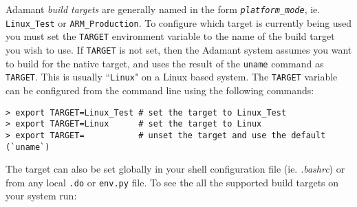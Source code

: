 Adamant \textit{build targets} are generally named in the form \texttt{\textit{platform}\_\textit{mode}}, ie. \texttt{Linux\_Test} or \texttt{ARM\_Production}. To configure which target is currently being used you must set the \texttt{TARGET} environment variable to the name of the build target you wish to use. If \texttt{TARGET} is not set, then the Adamant system assumes you want to build for the native target, and uses the result of the \texttt{uname} command as \texttt{TARGET}. This is usually ``\texttt{Linux}" on a Linux based system. The \texttt{TARGET} variable can be configured from the command line using the following commands:

\vspace{5mm} %
\begin{verbatim}
> export TARGET=Linux_Test # set the target to Linux_Test 
> export TARGET=Linux      # set the target to Linux 
> export TARGET=           # unset the target and use the default (`uname`)
\end{verbatim}
\vspace{5mm} %

The target can also be set globally in your shell configuration file (ie. \textit{.bashrc}) or from any local \texttt{.do} or \texttt{env.py} file. To see the all the supported build targets on your system run:

